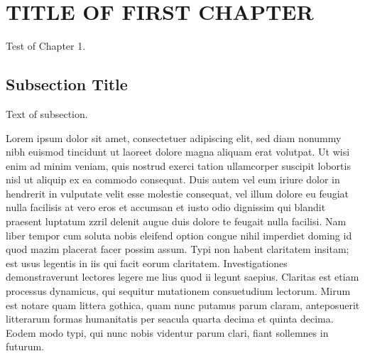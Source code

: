 \documentclass[12pt]{etsu_thesis}
\begin{document}
\listoffigures


\newpage
\section{TITLE OF FIRST CHAPTER}
Test of Chapter 1.

\subsection{Subsection Title}
Text of subsection.

Lorem ipsum dolor sit amet, consectetuer adipiscing elit, sed diam nonummy nibh euismod tincidunt ut laoreet dolore magna aliquam erat volutpat. Ut wisi enim ad minim veniam, quis nostrud exerci tation ullamcorper suscipit lobortis nisl ut aliquip ex ea commodo consequat. Duis autem vel eum iriure dolor in hendrerit in vulputate velit esse molestie consequat, vel illum dolore eu feugiat nulla facilisis at vero eros et accumsan et iusto odio dignissim qui blandit praesent luptatum zzril delenit augue duis dolore te feugait nulla facilisi. Nam liber tempor cum soluta nobis eleifend option congue nihil imperdiet doming id quod mazim placerat facer possim assum. Typi non habent claritatem insitam; est usus legentis in iis qui facit eorum claritatem. Investigationes demonstraverunt lectores legere me lius quod ii legunt saepius. Claritas est etiam processus dynamicus, qui sequitur mutationem consuetudium lectorum. Mirum est notare quam littera gothica, quam nunc putamus parum claram, anteposuerit litterarum formas humanitatis per seacula quarta decima et quinta decima. Eodem modo typi, qui nunc nobis videntur parum clari, fiant sollemnes in futurum.


\end{document}
